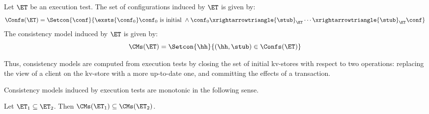 \begin{definition}
\label{def:cm}
Let $\ET$ be an execution test.
The set of configurations induced by $\ET$ is given by:
\[
\Confs(\ET) = \Setcon{ \conf}{ \exsts{\conf_0} \conf_0 \text{ is initial } \wedge \conf_0 \xrightarrowtriangle{\stub}_{\ET} \cdots \xrightarrowtriangle{\stub}_{\ET} \conf }
\]
The consistency model induced by $\ET$ is given by:
\[ 
\CMs(\ET) = \Setcon{ \hh }{ (\hh, \stub) \in \Confs(\ET) }
\]
%
\end{definition}
Thus, consistency models are computed from execution tests by closing the set of initial kv-stores with 
respect to two operations: replacing the view of a client on the kv-store with a more up-to-date one, and committing 
the effects of a transaction. 

Consistency models induced by execution tests are monotonic in the following sense.
\begin{proposition}
\label{prop:mono-et}
Let $\ET_1 \subseteq \ET_2$. Then $\CMs(\ET_1) \subseteq \CMs(\ET_2)$.
\end{proposition}
%

